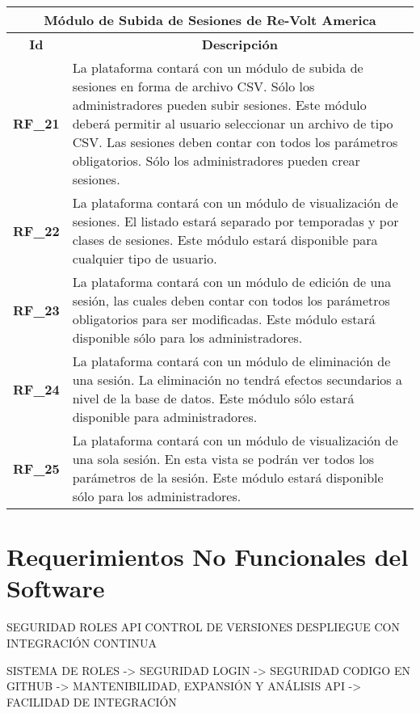 \begin{center}
	\begin{tabular}{ | l | p{15cm} |}
		\hline
		\multicolumn{2}{|c|}{\textbf{Módulo de Subida de Sesiones de Re-Volt America}} \\
		\hline
		\multicolumn{1}{|c|}{\textbf{Id}} & \multicolumn{1}{|c|}{\textbf{Descripción}} \\
		\hline
		{\textbf{RF\_21}} & La plataforma contará con un módulo de subida de sesiones en forma de archivo CSV. Sólo los administradores pueden subir sesiones. Este módulo deberá permitir al usuario seleccionar un archivo de tipo CSV. Las sesiones deben contar con todos los parámetros obligatorios. Sólo los administradores pueden crear sesiones. \\ \hline
		
		{\textbf{RF\_22}} & La plataforma contará con un módulo de visualización de sesiones. El listado estará separado por temporadas y por clases de sesiones. Este módulo estará disponible para cualquier tipo de usuario. \\ \hline
		
		{\textbf{RF\_23}} & La plataforma contará con un módulo de edición de una sesión, las cuales deben contar con todos los parámetros obligatorios para ser modificadas. Este módulo estará disponible sólo para los administradores. \\ \hline
		
		{\textbf{RF\_24}} & La plataforma contará con un módulo de eliminación de una sesión. La eliminación no tendrá efectos secundarios a nivel de la base de datos. Este módulo sólo estará disponible para administradores. \\ \hline
		
		{\textbf{RF\_25}} & La plataforma contará con un módulo de visualización de una sola sesión. En esta vista se podrán ver todos los parámetros de la sesión. Este módulo estará disponible sólo para los administradores. \\ \hline
	\end{tabular}
\end{center}

\section{Requerimientos No Funcionales del Software}

SEGURIDAD
ROLES
API
CONTROL DE VERSIONES
DESPLIEGUE CON INTEGRACIÓN CONTINUA

SISTEMA DE ROLES -> SEGURIDAD
LOGIN -> SEGURIDAD
CODIGO EN GITHUB -> MANTENIBILIDAD, EXPANSIÓN Y ANÁLISIS
API -> FACILIDAD DE INTEGRACIÓN

